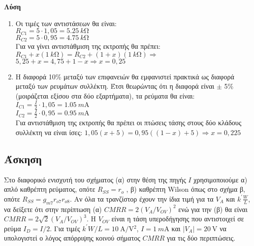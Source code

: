 \documentclass[11pt,a4paper,titlepage,fleqn]{article}
\begin{document}
	\textbf{Λύση}
	\begin{enumerate}[label=\noanw\alph*.]
		\item Οι τιμές των αντιστάσεων θα είναι: \\
		$R_{C1} = 5 \cdot 1,05 = \SI{5,25}{k\ohm}$ \\
		$R_{C2} = 5 \cdot 0,95 = \SI{4,75}{k\ohm}$ \\
		Για να γίνει αντιστάθμιση της εκτροπής θα πρέπει:
		$R_{C1} + x( \SI{1}{k\ohm}) = R_{C2} +  (1 + x)( \SI{1}{k\ohm}) \Rightarrow$ \\
		$5,25+x=4,75+1-x \Rightarrow x = 0,25$
		\item
		Η διαφορά 10\% μεταξύ των επιφανειών θα εμφανιστεί πρακτικά ως διαφορά μεταξύ των ρευμάτων συλλέκτη. Έτσι θεωρώντας ότι η διαφορά είναι $\pm$ 5\% (μοιράζεται εξίσου στα δύο εξαρτήματα), τα ρεύματα θα είναι: \\
		 $I_{C1} = \frac{I}{2} \cdot 1,05 = \SI{1,05}{m\ampere}$ \\
		 $I_{C2} = \frac{I}{2} \cdot 0,95 = \SI{0,95}{m\ampere}$ \\
		 Για αντιστάθμιση της εκτροπής θα πρέπει οι πτώσεις τάσης στους δύο κλάδους συλλέκτη να είναι ίσες: $1,05(x+5) = 0,95((1-x)+5) \Rightarrow x = 0,225$
	\end{enumerate}
	
	\subsection{Άσκηση}
	\label{sec:D.S17S15I14}
	
	Στο διαφορικό ενισχυτή του σχήματος (α) στην θέση της πηγής $I$ χρησιμοποιούμε α) απλό καθρέπτη ρεύματος, οπότε $R_{SS}=r_o$ , β) καθρέπτη Wilson όπως στο σχήμα β, οπότε $R_{SS} = g_{m7}r_{o7}r_{o8}$. Αν όλα τα τρανζίστορ έχουν την ίδια τιμή για τα $V_A$ και $k^{'} \frac{W}{L}$, να δείξετε ότι στην περίπτωση (α) $CMRR=2{(V_A / V_{OV})}^2$ ενώ για την (β) θα είναι $CMRR=2\sqrt{2}{(V_A / V_{OV})}^3$. Η $V_{OV}$ είναι η τάση υπεροδήγησης που αντιστοιχεί σε ρεύμα $I_D = I / 2$. Για τιμές $k^{'} W /L = \SI{10}{\ampere/\volt ^2 }$, $I = \SI{1}{m\ampere}$ και $|V_A|=\SI{20}{\volt}$ να υπολογιστεί ο λόγος απόρριψης κοινού σήματος $CMRR$ για τις δύο περιπτώσεις.
	
\end{document}
